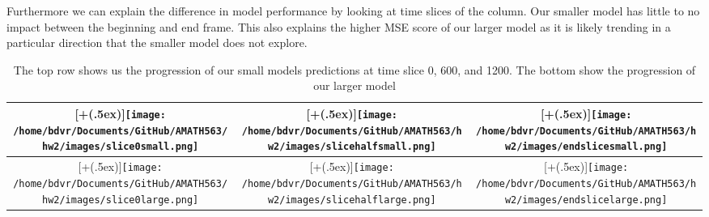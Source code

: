 \documentclass[12pt]{article}
\newcommand*{\addheight}[2][.5ex]{%
	\raisebox{0pt}[\dimexpr\height+(#1)\relax]{#2}%
}
\begin{document}
	Furthermore we can explain the difference in model performance by looking at time slices of the column. Our smaller model has little to no impact between the beginning and end frame. This also explains the higher MSE score of our larger model as it is likely trending in a particular direction that the smaller model does not explore.
	
	\begin{table}[H]
		\begin{center}
			\begin{tabular*}{1.08\linewidth}{|c|c|c|}
				\hline
				\addheight{\texttt{[image: /home/bdvr/Documents/GitHub/AMATH563/hw2/images/slice0small.png]}} 
&
\addheight{\texttt{[image: /home/bdvr/Documents/GitHub/AMATH563/hw2/images/slicehalfsmall.png]}} 
& 
\addheight{\texttt{[image: /home/bdvr/Documents/GitHub/AMATH563/hw2/images/endslicesmall.png]}} 
				\\
				\hline
				\addheight{\texttt{[image: /home/bdvr/Documents/GitHub/AMATH563/hw2/images/slice0large.png]}} 
				&
				\addheight{\texttt{[image: /home/bdvr/Documents/GitHub/AMATH563/hw2/images/slicehalflarge.png]}} 
				&
				\addheight{\texttt{[image: /home/bdvr/Documents/GitHub/AMATH563/hw2/images/endslicelarge.png]}} 
				\\
				\hline
			\end{tabular*}
		\end{center}
		\caption{The top row shows us the progression of our small models predictions at time slice 0, 600, and 1200. The bottom show the progression of our larger model}
	\end{table}
\end{document}
